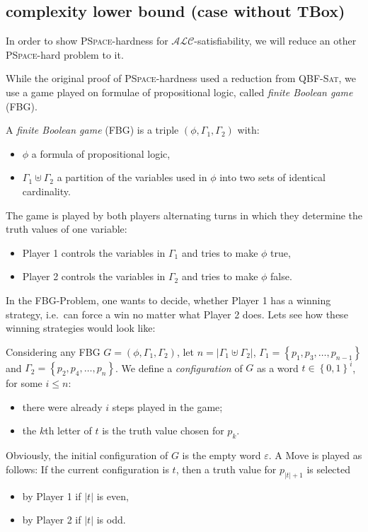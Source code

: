\subsection{complexity lower bound (case without TBox)}
In order to show  \textsc{PSpace}-hardness for $\mathcal{ALC}$-satisfiability,
we will reduce an other \textsc{PSpace}-hard problem to it.

While the original proof of \textsc{PSpace}-hardness used a reduction from \textsc{QBF-Sat},
we use a game played on formulae of propositional logic, called \textit{finite Boolean game} (FBG).

\begin{definition*}[FBG]
	A \textit{finite Boolean game} (FBG) is a triple $(\phi, \Gamma_1, \Gamma_2)$ with:
	\begin{itemize}
		\item $\phi$ a formula of propositional logic,
		\item $\Gamma_1 \uplus \Gamma_2$ a partition of the variables used in $\phi$ into two sets of identical cardinality.
	\end{itemize}
	The game is played by both players alternating turns in which they determine the truth values of one variable:
	\begin{itemize}
		\item Player 1 controls the variables in $\Gamma_1$ and tries to make $\phi$ true,
		\item Player 2 controls the variables in $\Gamma_2$ and tries to make $\phi$ false.
	\end{itemize}
\end{definition*}

In the FBG-Problem, one wants to decide, whether Player 1 has a winning strategy,
i.e.\ can force a win no matter what Player 2 does.
Lets see how these winning strategies would look like:

Considering any FBG $G = (\phi, \Gamma_1, \Gamma_2)$, let $n = \lvert \Gamma_1 \uplus \Gamma_2 \rvert$,
$\Gamma_1 = \left\{ p_1, p_3, \ldots, p_{n-1} \right\}$ and $\Gamma_2 = \left\{ p_2, p_4, \ldots, p_n \right\}$.
We define a \textit{configuration} of $G$ as a word $t \in \left\{ 0,1 \right\}^i$, for some $i \leq n$:
\begin{itemize}
	\item there were already $i$ steps played in the game;
	\item the $k$th letter of $t$ is the truth value chosen for $p_k$.
\end{itemize}
Obviously, the initial configuration of $G$ is the empty word $\varepsilon$.
A Move is played as follows:
If the current configuration is  $t$, then a truth value for $p_{\lvert t \rvert + 1}$ is selected
\begin{itemize}
	\item by Player 1 if $\lvert t \rvert$ is even,
	\item by Player 2 if $\lvert t \rvert$ is odd.
\end{itemize}
